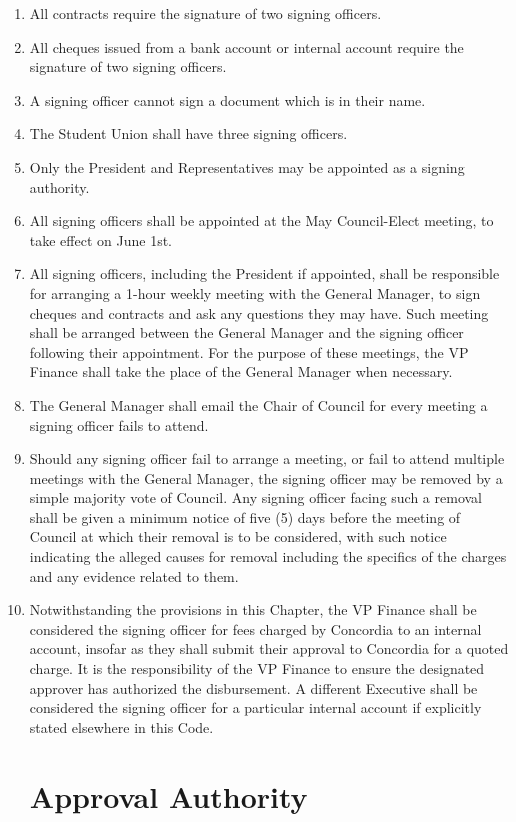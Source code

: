 \documentclass[oneside]{book}
\begin{document}
\begin{enumerate}
\item All contracts require the signature of two signing officers.
\item All cheques issued from a bank account or internal account require the signature of two signing officers.
\item A signing officer cannot sign a document which is in their name. 
\item The Student Union shall have three signing officers.
\item Only the President and Representatives may be appointed as a signing authority.
\item All signing officers shall be appointed at the May Council-Elect meeting, to take effect on June 1st.
\item All signing officers, including the President if appointed, shall be responsible for arranging a 1-hour weekly meeting with the General Manager, to sign cheques and contracts and ask any questions they may have. Such meeting shall be arranged between the General Manager and the signing officer following their appointment. For the purpose of these meetings, the VP Finance shall take the place of the General Manager when necessary.
\item The General Manager shall email the Chair of Council for every meeting a signing officer fails to attend. 
\item Should any signing officer fail to arrange a meeting, or fail to attend multiple meetings with the General Manager, the signing officer may be removed by a simple majority vote of Council. Any signing officer facing such a removal shall be given a minimum notice of five (5) days before the meeting of Council at which their removal is to be considered, with such notice indicating the alleged causes for removal including the specifics of the charges and any evidence related to them.
\item Notwithstanding the provisions in this Chapter, the VP Finance shall be considered the signing officer for fees charged by Concordia to an internal account, insofar as they shall submit their approval to Concordia for a quoted charge. It is the responsibility of the VP Finance to ensure the designated approver has authorized the disbursement. A different Executive shall be considered the signing officer for a particular internal account if explicitly stated elsewhere in this Code.

\chapter{\label{Approval_Authority}Approval Authority}

\end{enumerate}
\end{document}
